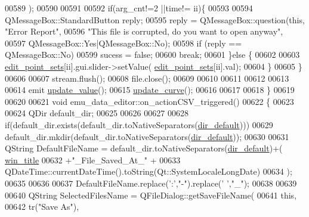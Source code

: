 \begin{DoxyCode}
{00589                               );
00590 
00591 
00592              \textcolor{keywordflow}{if}(arg\_cnt!=2 ||time!= ii)\{
00593 
00594                  QMessageBox::StandardButton reply;
00595                  reply = QMessageBox::question(\textcolor{keyword}{this}, \textcolor{stringliteral}{"Error Report"},
00596                                                \textcolor{stringliteral}{"This file is corrupted, do you want to open anyway"},
00597                                                QMessageBox::Yes|QMessageBox::No);
00598                  \textcolor{keywordflow}{if} (reply == QMessageBox::No)
00599                   sucess = \textcolor{keyword}{false};
00600                   \textcolor{keywordflow}{break};
00601              \}\textcolor{keywordflow}{else} \{
00602 
00603                   \hyperlink{a00008_ab093b86d07b4eb96c36878089a7d97df}{edit\_point\_sets}[ii].gui.slider->setValue(
      \hyperlink{a00008_ab093b86d07b4eb96c36878089a7d97df}{edit\_point\_sets}[ii].val);
00604              \}
00605              \}
00606 
00607        stream.flush();
00608        file.close();
00609 
00610 
00611 
00612 
00613 
00614        emit \hyperlink{a00008_ad5f20fdbb4731185020ff4e90cd1ead2}{update\_value}();
00615        \hyperlink{a00008_a15cbcf5f0a17281468800f47898f60c1}{update\_curve}();
00616 
00617 
00618 \}
00619 
00620 
00621 \textcolor{keywordtype}{void} emu\_data\_editor::on\_actionCSV\_triggered()
00622 \{
00623 
00624     QDir default\_dir;
00625 
00626 
00627 
00628     \textcolor{keywordflow}{if}(default\_dir.exists(default\_dir.toNativeSeparators(\hyperlink{a00008_aa55b7d8008e31fcc971692b493e7cf34}{dir\_default})))
00629         default\_dir.mkdir(default\_dir.toNativeSeparators(\hyperlink{a00008_aa55b7d8008e31fcc971692b493e7cf34}{dir\_default}));
00630 
00631     QString DefaultFileName =  default\_dir.toNativeSeparators(\hyperlink{a00008_aa55b7d8008e31fcc971692b493e7cf34}{dir\_default})+(
      \hyperlink{a00008_a2abdde44f37258778dcc571e8cc7ed1a}{win\_title}
00632                                                                             +\textcolor{stringliteral}{"\_File\_Saved\_At\_"} +
00633                                QDateTime::currentDateTime().toString(Qt::SystemLocaleLongDate)
00634                                );
00635 
00636 
00637     DefaultFileName.replace(\textcolor{charliteral}{':'},\textcolor{stringliteral}{"-"}).replace(\textcolor{charliteral}{' '},\textcolor{stringliteral}{"\_"});
00638 
00639 
00640     QString SelectedFilesName = QFileDialog::getSaveFileName(
00641         \textcolor{keyword}{this},
00642         tr(\textcolor{stringliteral}{"Save As"}),
}
\end{DoxyCode}
